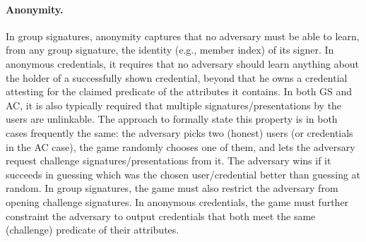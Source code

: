   




\paragraph{Anonymity.} %
In group signatures, anonymity captures that no adversary must be able to learn,
from any group signature, the identity (e.g., member index) of its signer. In 
anonymous credentials, it requires that no adversary should learn anything about
the holder of a successfully shown credential, beyond that he owns a credential
attesting for the claimed predicate of the attributes it contains. In both GS
and AC, it is also typically required that
multiple signatures/presentations by the users are unlinkable. The approach to
formally state this property is in both cases frequently the same: the adversary
picks two (honest) users (or credentials in the AC case), the game randomly
chooses one of them, and lets the adversary request challenge
signatures/presentations from it. The adversary wins if it succeeds in guessing
which was the chosen user/credential better than guessing at random. In group
signatures, the game must also restrict the adversary from opening challenge
signatures. In anonymous credentials, the game must further constraint the
adversary to output credentials that both meet the same (challenge) predicate
of their attributes.

